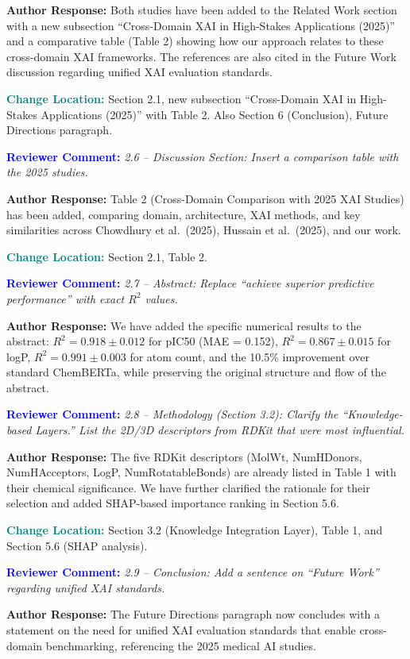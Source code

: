 \documentclass[12pt]{article}
\newcommand{\RC}[1]{\textbf{\textcolor{blue}{Reviewer Comment:}} \textit{#1}\vspace{0.3em}}
\newcommand{\AR}[1]{\textbf{Author Response:} #1\vspace{0.8em}}
\newcommand{\CH}[1]{\textbf{\textcolor{teal}{Change Location:}} #1\vspace{0.5em}}
\begin{document}
\AR{Both studies have been added to the Related Work section with a new subsection ``Cross-Domain XAI in High-Stakes Applications (2025)'' and a comparative table (Table 2) showing how our approach relates to these cross-domain XAI frameworks. The references are also cited in the Future Work discussion regarding unified XAI evaluation standards.}

\CH{Section 2.1, new subsection ``Cross-Domain XAI in High-Stakes Applications (2025)'' with Table 2. Also Section 6 (Conclusion), Future Directions paragraph.}

\bigskip

\RC{2.6 -- Discussion Section: Insert a comparison table with the 2025 studies.}

\AR{Table 2 (Cross-Domain Comparison with 2025 XAI Studies) has been added, comparing domain, architecture, XAI methods, and key similarities across Chowdhury et al.\ (2025), Hussain et al.\ (2025), and our work.}

\CH{Section 2.1, Table 2.}

\bigskip

\RC{2.7 -- Abstract: Replace ``achieve superior predictive performance'' with exact $R^2$ values.}

\AR{We have added the specific numerical results to the abstract: $R^2 = 0.918 \pm 0.012$ for pIC50 (MAE = 0.152), $R^2 = 0.867 \pm 0.015$ for logP, $R^2 = 0.991 \pm 0.003$ for atom count, and the 10.5\% improvement over standard ChemBERTa, while preserving the original structure and flow of the abstract.}

\bigskip

\RC{2.8 -- Methodology (Section 3.2): Clarify the ``Knowledge-based Layers.'' List the 2D/3D descriptors from RDKit that were most influential.}

\AR{The five RDKit descriptors (MolWt, NumHDonors, NumHAcceptors, LogP, NumRotatableBonds) are already listed in Table 1 with their chemical significance. We have further clarified the rationale for their selection and added SHAP-based importance ranking in Section 5.6.}

\CH{Section 3.2 (Knowledge Integration Layer), Table 1, and Section 5.6 (SHAP analysis).}

\bigskip

\RC{2.9 -- Conclusion: Add a sentence on ``Future Work'' regarding unified XAI standards.}

\AR{The Future Directions paragraph now concludes with a statement on the need for unified XAI evaluation standards that enable cross-domain benchmarking, referencing the 2025 medical AI studies.}
\end{document}
